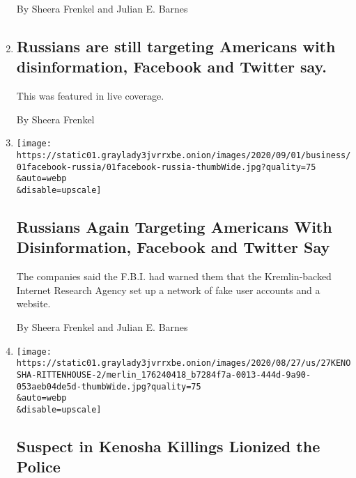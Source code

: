 \begin{enumerate}
  By Sheera Frenkel and Julian E. Barnes
\item
  \href{/live/2020/09/01/us/trump-vs-biden/russians-are-still-targeting-americans-with-disinformation-facebook-and-twitter-say}{}

  \hypertarget{russians-are-still-targeting-americans-with-disinformation-facebook-and-twitter-say}{%
  \subsection{Russians are still targeting Americans with
  disinformation, Facebook and Twitter
  say.}\label{russians-are-still-targeting-americans-with-disinformation-facebook-and-twitter-say}}

  This was featured in live coverage.

  By Sheera Frenkel
\item
  \href{/2020/09/01/technology/facebook-russia-disinformation-election.html}{}

  \texttt{[image: https://static01.graylady3jvrrxbe.onion/images/2020/09/01/business/01facebook-russia/01facebook-russia-thumbWide.jpg?quality=75\\\&auto=webp\\\&disable=upscale]}

  \hypertarget{russians-again-targeting-americans-with-disinformation-facebook-and-twitter-say}{%
  \subsection{Russians Again Targeting Americans With Disinformation,
  Facebook and Twitter
  Say}\label{russians-again-targeting-americans-with-disinformation-facebook-and-twitter-say}}

  The companies said the F.B.I. had warned them that the Kremlin-backed
  Internet Research Agency set up a network of fake user accounts and a
  website.

  By Sheera Frenkel and Julian E. Barnes
\item
  \href{/2020/08/27/us/kyle-rittenhouse-kenosha.html}{}

  \texttt{[image: https://static01.graylady3jvrrxbe.onion/images/2020/08/27/us/27KENOSHA-RITTENHOUSE-2/merlin\_176240418\_b7284f7a-0013-444d-9a90-053aeb04de5d-thumbWide.jpg?quality=75\\\&auto=webp\\\&disable=upscale]}

  \hypertarget{suspect-in-kenosha-killings-lionized-the-police}{%
  \subsection{Suspect in Kenosha Killings Lionized the
  Police}\label{suspect-in-kenosha-killings-lionized-the-police}}


\end{enumerate}
